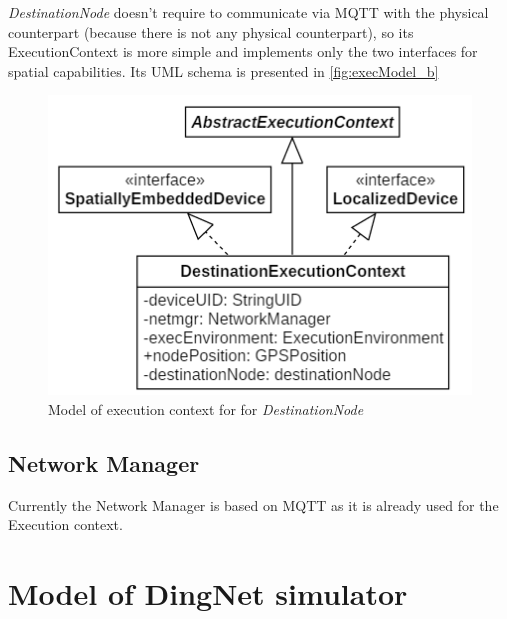 \textit{DestinationNode} doesn't require to communicate via MQTT with the physical counterpart (because there is not any physical counterpart), so its ExecutionContext is more simple and implements only the two interfaces for spatial capabilities. Its UML schema is presented in \autoref{fig:execModel_b}

\begin{figure}[h]
    \centering
    \includegraphics[scale=0.9]{images/execContextModel_v2b.png}
    \caption{Model of execution context for for \textit{DestinationNode}}
    \label{fig:execModel_b}
\end{figure}

\subsection{Network Manager}
Currently the Network Manager is based on MQTT as it is already used for the Execution context.

\section{Model of DingNet simulator}

